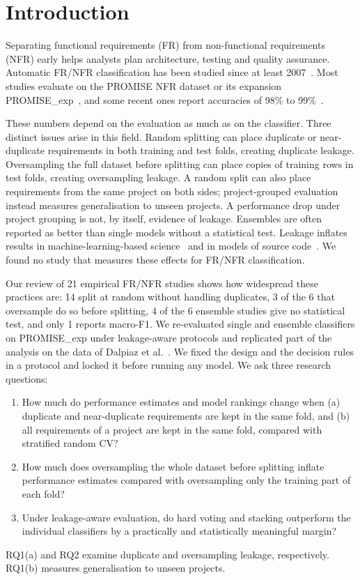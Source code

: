 \section{Introduction}
\label{sec:intro}

Separating functional requirements (FR) from non-functional requirements (NFR) early helps analysts plan architecture, testing and quality assurance. Automatic FR/NFR classification has been studied since at least 2007~\cite{clelandhuang2007,kurtanovic2017,abad2017what}. Most studies evaluate on the PROMISE NFR dataset or its expansion PROMISE\_exp~\cite{lima2019}, and some recent ones report accuracies of 98\% to 99\%~\cite{metu2024hybrid,baskoro2021systematic}.

These numbers depend on the evaluation as much as on the classifier. Three distinct issues arise in this field. Random splitting can place duplicate or near-duplicate requirements in both training and test folds, creating duplicate leakage. Oversampling the full dataset before splitting can place copies of training rows in test folds, creating oversampling leakage. A random split can also place requirements from the same project on both sides; project-grouped evaluation instead measures generalisation to unseen projects. A performance drop under project grouping is not, by itself, evidence of leakage. Ensembles are often reported as better than single models without a statistical test. Leakage inflates results in machine-learning-based science~\cite{kaufman2012,kapoor2023} and in models of source code~\cite{allamanis2019adverse}. We found no study that measures these effects for FR/NFR classification.

Our review of 21 empirical FR/NFR studies shows how widespread these practices are: 14 split at random without handling duplicates, 3 of the 6 that oversample do so before splitting, 4 of the 6 ensemble studies give no statistical test, and only 1 reports macro-F1. We re-evaluated single and ensemble classifiers on PROMISE\_exp under leakage-aware protocols and replicated part of the analysis on the data of Dalpiaz et al.~\cite{dalpiaz2019}. We fixed the design and the decision rules in a protocol and locked it before running any model. We ask three research questions:
\begin{enumerate}
\item[\textbf{RQ1}] How much do performance estimates and model rankings change when (a) duplicate and near-duplicate requirements are kept in the same fold, and (b) all requirements of a project are kept in the same fold, compared with stratified random CV?
\item[\textbf{RQ2}] How much does oversampling the whole dataset before splitting inflate performance estimates compared with oversampling only the training part of each fold?
\item[\textbf{RQ3}] Under leakage-aware evaluation, do hard voting and stacking outperform the individual classifiers by a practically and statistically meaningful margin?
\end{enumerate}
RQ1(a) and RQ2 examine duplicate and oversampling leakage, respectively. RQ1(b) measures generalisation to unseen projects.

